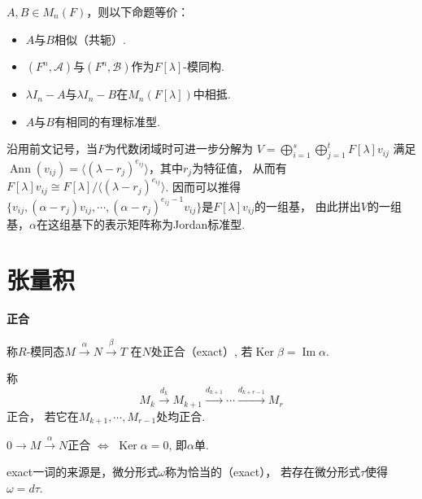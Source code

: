     \begin{theorem}
        $A,B\in M_n(F)$，则以下命题等价：
        \begin{itemize}
        \item[(1)] $A$与$B$相似（共轭）.
        \item[(2)] $(F^n,\mathscr{A})$与$(F^n,\mathscr{B})$作为$F[\lambda]$-模同构.
        \item[(3)] $\lambda I_n-A$与$\lambda I_n-B$在$M_n(F[\lambda])$中相抵.
        \item[(4)] $A$与$B$有相同的有理标准型.
        \end{itemize}
    \end{theorem}
    \begin{definition}
        沿用前文记号，当$F$为代数闭域时可进一步分解为
        $V=\bigoplus\limits_{i=1}^s\bigoplus\limits_{j=1}^t F[\lambda]v_{ij}$
        满足$\operatorname{Ann}(v_{ij})=\langle(\lambda-r_j)^{e_{ij}}\rangle$，其中$r_j$为特征值，
        从而有$F[\lambda]v_{ij}\cong F[\lambda]/\langle(\lambda-r_j)^{e_{ij}}\rangle$.
        因而可以推得$\{v_{ij},(\alpha-r_j)v_{ij},\cdots,(\alpha-r_j)^{e_{ij}-1}v_{ij}\}$是$F[\lambda]v_{ij}$的一组基，
        由此拼出$V$的一组基，$\alpha$在这组基下的表示矩阵称为Jordan标准型.
    \end{definition}




\section{张量积}

\begin{definition} \textbf{正合}\par
    \qquad 称$R$-模同态$M\xrightarrow{\alpha}N\xrightarrow{\beta}T$
在$N$处正合（exact）, 若$\operatorname{Ker} \beta=\operatorname{Im} \alpha$.\par
    \qquad 称$$M_k \xrightarrow{d_k} M_{k+1} \xrightarrow{d_{k+1}}\cdots\xrightarrow{d_{k+r-1}}M_r$$正合， 
    若它在$M_{k+1},\cdots,M_{r-1}$处均正合.
\end{definition}

\begin{example}
    $0\rightarrow M\xrightarrow{\alpha} N$正合
     $\iff$ $\operatorname{Ker}\alpha=0$, 即$\alpha$单.\par
\end{example}

\begin{remark}
    exact一词的来源是，微分形式$\omega$称为恰当的（exact），
    若存在微分形式$\tau$使得$\omega=d\tau$.
\end{remark}

